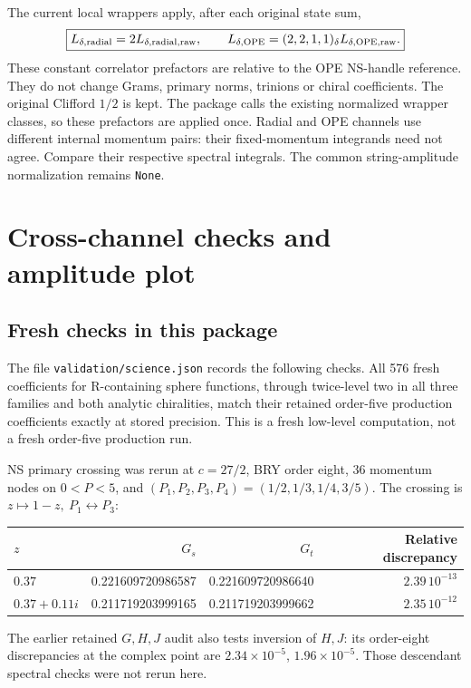 \documentclass[11pt]{article}
\newcommand{\code}[1]{\texttt{\small #1}}
\begin{document}
The current local wrappers apply, after each original state sum,
\begin{equation}
 \boxed{L_{\delta,\rm radial}=2L_{\delta,\rm radial,raw},\qquad
 L_{\delta,\rm OPE}=(2,2,1,1)_\delta L_{\delta,\rm OPE,raw}.}
 \label{eq:torus-factors}
\end{equation}
These constant correlator prefactors are relative to the OPE
NS-handle reference. They do not change Grams, primary norms,
trinions or chiral coefficients. The original Clifford \(1/2\)
is kept. The package calls the existing normalized wrapper classes,
so these prefactors are applied once.
Radial and OPE channels use different internal momentum pairs:
their fixed-momentum integrands need not agree. Compare their
respective spectral integrals. The common string-amplitude
normalization remains \code{None}.

\section{Cross-channel checks and amplitude plot}
\subsection{Fresh checks in this package}
The file \code{validation/science.json} records the following checks.
All 576 fresh coefficients for R-containing sphere functions, through
twice-level two in all three families and both analytic chiralities,
match their retained order-five production coefficients exactly at
stored precision. This is a fresh low-level computation, not a fresh
order-five production run.

NS primary crossing was rerun at \(c=27/2\), BRY order eight,
36 momentum nodes on \(0<P<5\), and
\((P_1,P_2,P_3,P_4)=(1/2,1/3,1/4,3/5)\).
The crossing is \(z\mapsto1-z,\ P_1\leftrightarrow P_3\):
\begin{center}
\begin{tabular}{lrrr}
\toprule
\(z\)&\(G_s\)&\(G_t\)&Relative discrepancy\\ \midrule
\(0.37\)&0.221609720986587&0.221609720986640&\(2.39\,10^{-13}\)\\
\(0.37+0.11i\)&0.211719203999165&0.211719203999662&\(2.35\,10^{-12}\)\\
\bottomrule
\end{tabular}
\end{center}
The earlier retained \(G,H,J\) audit also tests inversion of \(H,J\):
its order-eight discrepancies at the complex point are
\(2.34\times10^{-5}\), \(1.96\times10^{-5}\).
Those descendant spectral checks were not rerun here.
\end{document}
